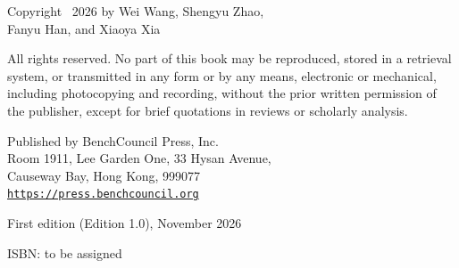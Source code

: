 \clearpage\thispagestyle{empty}
\vspace*{6mm}
\begingroup\setlength{\parindent}{0pt}\setlength{\parskip}{12pt}
Copyright \textcopyright\ 2026 by Wei Wang, Shengyu Zhao,\\
Fanyu Han, and Xiaoya Xia

All rights reserved. No part of this book may be reproduced, stored in a retrieval system, or transmitted in any form or by any means, electronic or mechanical, including photocopying and recording, without the prior written permission of the publisher, except for brief quotations in reviews or scholarly analysis.

Published by BenchCouncil Press, Inc.\\
Room 1911, Lee Garden One, 33 Hysan Avenue,\\
Causeway Bay, Hong Kong, 999077\\
\href{https://press.benchcouncil.org}{\color{FrameworkBlue}\texttt{https://press.benchcouncil.org}}

First edition (Edition 1.0), November 2026

ISBN: to be assigned
\endgroup
\clearpage
